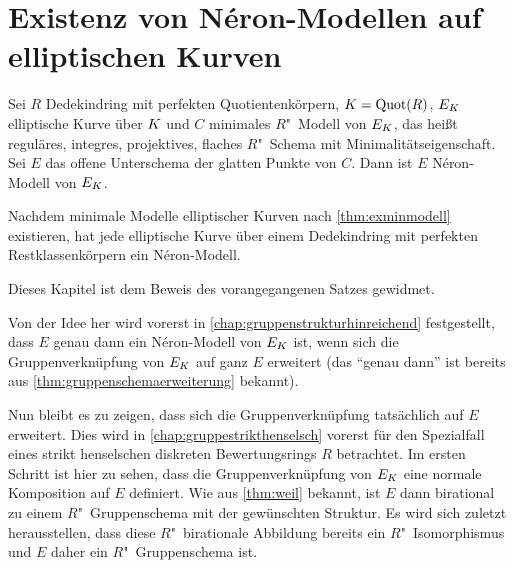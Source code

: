 \chapter{Existenz von Néron-Modellen auf elliptischen Kurven}
\label{chap:exneronmodelle}
\begin{Theorem}\label{thm:exneronmodelle}

  Sei $R$ Dedekindring mit perfekten Quotientenkörpern,
  ${K=\operatorname{Quot}(R)}$, $E_{K}$ elliptische Kurve über $K$ und $C$ minimales
  $R$"~Modell von $E_{K}$,
  das heißt reguläres, integres, projektives,
  flaches $R$"~Schema mit Minimalitätseigenschaft.
  Sei $E$ das offene Unterschema der glatten Punkte von $C$.
  Dann ist $E$ Néron-Modell von $E_{K}$.

  Nachdem minimale Modelle elliptischer
  Kurven nach \ref{thm:exminmodell} existieren, hat jede
  elliptische Kurve über einem Dedekindring mit perfekten
  Restklassenkörpern ein Néron-Modell.
\end{Theorem}
Dieses Kapitel ist dem Beweis des vorangegangenen Satzes gewidmet.

Von der Idee her wird vorerst in
\autoref{chap:gruppenstrukturhinreichend} festgestellt, dass $E$ genau 
dann ein Néron-Modell von $E_{K}$ ist, wenn sich die Gruppenverknüpfung
von $E_{K}$ auf ganz $E$ erweitert (das \enquote{genau dann} ist
bereits aus \ref{thm:gruppenschemaerweiterung} bekannt).

Nun bleibt es zu zeigen, dass sich die Gruppenverknüpfung tatsächlich
auf $E$ erweitert.
Dies wird in \autoref{chap:gruppestrikthenselsch} vorerst für
den Spezialfall eines strikt henselschen diskreten Bewertungsrings
$R$ betrachtet. Im ersten Schritt ist hier zu sehen, dass die
Gruppenverknüpfung von $E_{K}$ eine normale Komposition auf $E$
definiert. Wie aus \ref{thm:weil} bekannt, ist $E$ dann birational zu
einem $R$"~Gruppenschema mit der gewünschten Struktur. Es wird sich
zuletzt herausstellen, dass diese $R$"~birationale Abbildung bereits
ein $R$"~Isomorphismus und $E$ daher ein $R$"~Gruppenschema ist.

